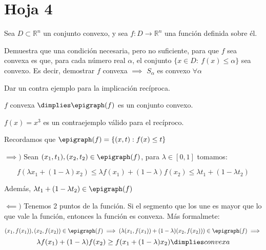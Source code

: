 \section{Hoja 4}


\begin{problem}[1]
\label{ejer:h4e1}

Sea  $D\subset\mathbb{R}^n$ un conjunto convexo, y sea $f:D\to \mathbb{R}^n$ una funci{\'o}n definida sobre {\'e}l. 


\ppart Demuestra que una condici{\'o}n necesaria, pero no suficiente, para que $f$ sea convexa es que, para cada n{\'u}mero real $\alpha$, el conjunto $\{x\in D:\ f(x)\leq \alpha\}$ sea convexo. 
%
Es decir, demostrar $f$ convexa $\implies$ $S_{\alpha}$ es convexo $\forall \alpha$

Dar un contra ejemplo para la implicación recíproca.

\ppart $f$ convexa $\dimplies \epigraph(f)$ es un conjunto convexo.

\solution

\spart $f(x) = x^3$  es un contraejemplo válido para el recíproco.

\spart Recordamos que $\epigraph(f) = \{(x,t) : f(x) \leq t\}$

$\implies)$ Sean $(x_1,t_1),(x_2,t_2)\in \epigraph(f)$, para $\lambda \in [0,1]$ tomamos:

\[
 f(\lambda x_1 + (1-\lambda) x_2) \leq \lambda f(x_1) + (1-\lambda) f(x_2) \leq \lambda t_1 + (1-\lambda t_2)
 \]

Además, $\lambda t_1 + (1-\lambda t_2) \in \epigraph(f)$


$\impliedby)$ Tenemos 2 puntos de la función.
%
Si el segmento que los une es mayor que lo que vale la función, entonces la función es convexa.
%
Más formalmete:

\[
    (x_1,f(x_1)),(x_2,f(x_2)) \in \epigraph(f) \implies \left(\lambda (x_1,f(x_1)) + (1-\lambda) (x_2,f(x_2))\right) \in \epigraph(f) \implies\]
    \[ \lambda f(x_1) + (1-\lambda) f(x_2) \geq f(x_1 + (1-\lambda) x_2) \dimplies convexa
\]


\end{problem}

